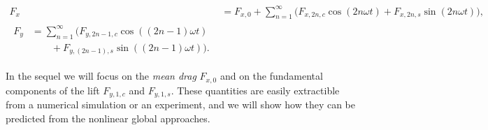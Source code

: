 \documentclass[twocolumn,10pt]{asme2ej}
\newcommand{\be}[1]{ \begin{equation} \label{#1}}
\newcommand{\ee}{\end{equation}}
\begin{document}
\begin{align}
F_x &=F_{x,0} + \sum_{n=1}^\infty \big( F_{x,2n,c} \cos ( 2 n \omega t) + F_{x,2n,s} \sin( 2 n  \omega t ) \big),
\\
\begin{split}
F_y  & =\sum_{n=1}^\infty \big( F_{y,{2n-1},c} \cos ((2n-1) \omega t )\\
             &\qquad + F_{y,(2n-1),s}  \sin ((2n-1) \omega t) \big).
\end{split}
\label{drag_lift_def}
\end{align}



In the sequel we will focus on the {\em mean drag}  $F_{x,0}$ and on the fundamental components of the lift  
$F_{y,1,c}$ and $F_{y,1,s}$. These quantities are easily extractible from a numerical simulation or an experiment, and we will
show how they can be predicted from the nonlinear global approaches.
 
  

   




\end{document}
